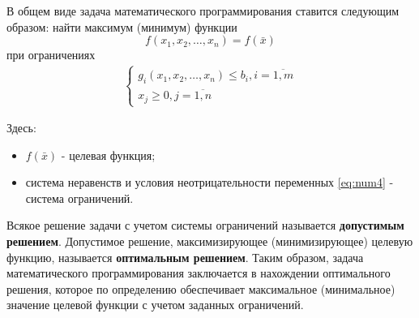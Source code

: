 \documentclass[a4paper,12pt]{report}
\begin{document}
В общем виде задача математического программирования ставится следующим образом: найти максимум (минимум) функции 
\begin{equation}
\label{eq:num3}
f(x_{1}, x_{2}, \ldots, x_{n}) = f(\bar{x})	
\end{equation}
при ограничениях
\begin{align}
\label{eq:num4}
\begin{cases}
g_{i}(x_{1}, x_{2}, \ldots, x_{n}) \leq b_{i}, i=\overline{1,m} \\
x_{j} \geq 0, j=\overline{1,n}
\end{cases}	
\end{align}

Здесь:
\begin{itemize}
\item $f(\bar{x})$ - целевая функция;
\item система неравенств и условия неотрицательности переменных \eqref{eq:num4} - система ограничений.
\end{itemize}

Всякое решение задачи с учетом системы ограничений называется \textbf{допустимым решением}. Допустимое решение, максимизирующее (минимизирующее) целевую функцию, называется \textbf{оптимальным решением}. Таким образом, задача математического программирования заключается в нахождении оптимального решения, которое по определению обеспечивает максимальное (минимальное) значение целевой функции с учетом заданных ограничений.
\end{document}
